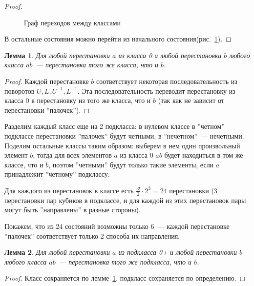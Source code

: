 \documentclass[utf8,a4paper,12pt]{article}
\newtheorem{lemma_cub}{Лемма}[section]
\begin{document}
\begin{proof}
\begin{figure}[ht]
\caption{Граф переходов между классами\label{states_graph}}
\end{figure}
В остальные состояния можно перейти из начального состояния(рис.~\ref{states_graph}).
\end{proof}
\begin{lemma_cub}
	Для любой перестановки $a$ из класса 0 и любой перестановки $b$ любого класса $ab$~--- перестановка того же класса, что и $b$.\label{lemma_superclasses}
\end{lemma_cub}
\begin{proof}
	Каждой перестановке $b$ соответствует некоторая последовательность из поворотов $U,L,U^{-1},L^{-1}$. Эта последовательность переводит перестановку из класса 0 в перестановку из того же класса, что и $b$ (так как не зависит от перестановки ''палочек'').
\end{proof}
Разделим каждый класс еще на 2 подкласса: в нулевом классе в ''четном'' подклассе перестановки ''палочек''  будут четными, в ''нечетном''~--- нечетными.
Поделим остальные классы таким образом: выберем в нем один произвольный элемент $b$, тогда для всех элементов $a$ из класса 0 $ab$ будет находиться в том же классе, что и $b$, поэтом ''четными'' будут только такие элементы, если $a$ принадлежит ''четному'' подклассу.

Для каждого из перестановок в классе есть $\frac{3!}{2}\cdot 2^3=24$ перестановки  (3 перестановки пар кубиков в подклассе, и для каждой из этих перестановок пары могут быть ''направлены'' в разные стороны).

Покажем, что из 24 состояний возможны только 6~--- каждой перестановке ''палочек'' соответствует только 2 способа их направления.
\begin{lemma_cub}
	Для любой перестановки $a$ из подкласса 0+ и любой перестановки $b$ любого класса $ab$~--- перестановка того же подкласса, что и $b$.\label{lemma_classes}
\end{lemma_cub}
\begin{proof}
Класс сохраняется по лемме~\ref{lemma_superclasses}, подкласс сохраняется по определению.
\end{proof}
\end{document}
